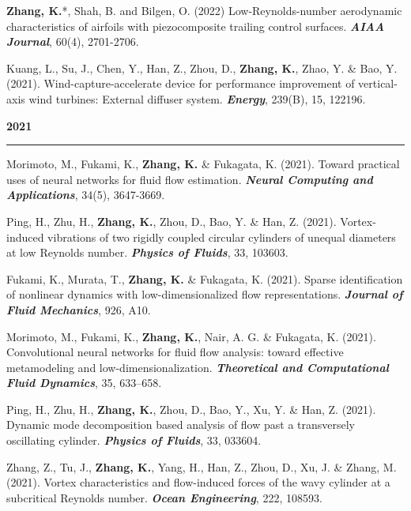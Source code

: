 \documentclass[10pt]{article}
\begin{document}
{\begin{etaremune}
  \item \textbf{Zhang, K.}*, Shah, B. and Bilgen, O. (2022) Low-Reynolds-number aerodynamic characteristics of airfoils with piezocomposite trailing control surfaces. \textit{\textbf{AIAA Journal}}, 60(4), 2701-2706.

	\item Kuang, L., Su, J., Chen, Y., Han, Z., Zhou, D., \textbf{Zhang, K.}, Zhao, Y. \& Bao, Y. (2021). Wind-capture-accelerate device for performance improvement of vertical-axis wind turbines: External diffuser system. \textit{\textbf{Energy}}, 239(B), 15, 122196. 

\item [] {\bf \color{Blue} 2021 \rule{14.8cm}{0.2mm}}

  \item Morimoto, M., Fukami, K., \textbf{Zhang, K.} \& Fukagata, K. (2021). Toward practical uses of neural networks for fluid flow estimation. \textit{\textbf{Neural Computing and Applications}}, 34(5), 3647-3669.

  \item Ping, H., Zhu, H., \textbf{Zhang, K.}, Zhou, D., Bao, Y. \& Han, Z. (2021). Vortex-induced vibrations of two rigidly coupled circular cylinders of unequal diameters at low Reynolds number. \textit{\textbf{Physics of Fluids}}, 33, 103603. 
  
  \item Fukami, K., Murata, T., \textbf{Zhang, K.} \& Fukagata, K. (2021). Sparse identification of nonlinear dynamics with low-dimensionalized flow representations. \textit{\textbf{Journal of Fluid Mechanics}}, 926, A10.
  
  \item Morimoto, M., Fukami, K., \textbf{Zhang, K.}, Nair, A. G. \& Fukagata, K. (2021). Convolutional neural networks for fluid flow analysis: toward effective metamodeling and low-dimensionalization. \textit{\textbf{Theoretical and Computational Fluid Dynamics}}, 35, 633–658.

  \item Ping, H., Zhu, H., \textbf{Zhang, K.}, Zhou, D., Bao, Y., Xu, Y. \& Han, Z. (2021). Dynamic mode decomposition based analysis of flow past a transversely oscillating cylinder. \textit{\textbf{Physics of Fluids}}, 33, 033604. 
  
  \item Zhang, Z., Tu, J., \textbf{Zhang, K.}, Yang, H., Han, Z., Zhou, D., Xu, J. \& Zhang, M. (2021). Vortex characteristics and flow-induced forces of the wavy cylinder at a subcritical Reynolds number. \textit{\textbf{Ocean Engineering}}, 222, 108593.
  

\end{etaremune}}
\end{document}

